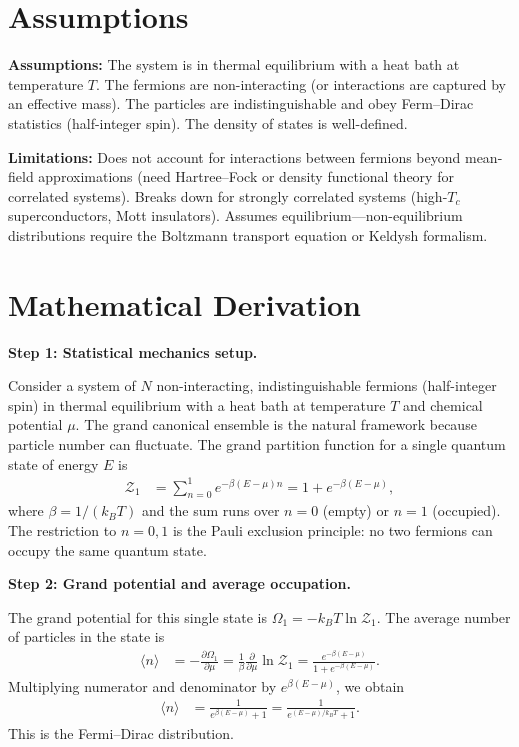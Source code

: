 \documentclass[11pt,openright]{book}
\begin{document}
\section*{Assumptions}

\textbf{Assumptions:} The system is in thermal equilibrium with a heat bath at temperature $T$. The fermions are non-interacting (or interactions are captured by an effective mass). The particles are indistinguishable and obey Ferm--Dirac statistics (half-integer spin). The density of states is well-defined.


\textbf{Limitations:} Does not account for interactions between fermions beyond mean-field approximations (need Hartree--Fock or density functional theory for correlated systems). Breaks down for strongly correlated systems (high-$T_c$ superconductors, Mott insulators). Assumes equilibrium---non-equilibrium distributions require the Boltzmann transport equation or Keldysh formalism.


\section*{Mathematical Derivation}

\textbf{Step 1: Statistical mechanics setup.}

Consider a system of $N$ non-interacting, indistinguishable fermions (half-integer spin) in thermal equilibrium with a heat bath at temperature $T$ and chemical potential $\mu$. The grand canonical ensemble is the natural framework because particle number can fluctuate. The grand partition function for a single quantum state of energy $E$ is
\begin{align}
\mathcal{Z}_1 &= \sum_{n=0}^{1} e^{-\beta(E - \mu)n} = 1 + e^{-\beta(E-\mu)},
\end{align}
where $\beta = 1/(k_B T)$ and the sum runs over $n = 0$ (empty) or $n = 1$ (occupied). The restriction to $n = 0, 1$ is the Pauli exclusion principle: no two fermions can occupy the same quantum state.

\textbf{Step 2: Grand potential and average occupation.}

The grand potential for this single state is $\Omega_1 = -k_B T \ln \mathcal{Z}_1$. The average number of particles in the state is
\begin{align}
\langle n \rangle &= -\frac{\partial \Omega_1}{\partial \mu} = \frac{1}{\beta}\frac{\partial}{\partial \mu}\ln\mathcal{Z}_1 = \frac{e^{-\beta(E-\mu)}}{1 + e^{-\beta(E-\mu)}}.
\end{align}
Multiplying numerator and denominator by $e^{\beta(E-\mu)}$, we obtain
\begin{align}
\langle n \rangle &= \frac{1}{e^{\beta(E-\mu)} + 1} = \frac{1}{e^{(E-\mu)/k_BT} + 1}.
\end{align}
This is the Fermi--Dirac distribution.
\end{document}
